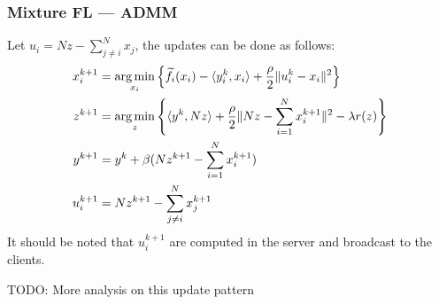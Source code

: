 \begin{frame}
\frametitle{Mixture FL --- ADMM}

Let $u_i = Nz - \sum\limits_{j\neq i}^N x_j$, the updates can be done as follows:
{\footnotesize
\begin{align*}
    x_i^{k+1} & = \operatorname*{arg\,min}_{x_i} \left\{ \widetilde{f}_i(x_i) - \langle y_i^k, x_i \rangle + \frac{\rho}{2} \lVert u_i^k - x_i \rVert^2 \right\} \\
    z^{k+1} & = \operatorname*{arg\,min}_{z} \left\{ \langle y^k, Nz \rangle + \frac{\rho}{2} \lVert Nz - \sum\limits_{i=1}^N x_i^{k+1} \rVert^2 - \lambda r(z) \right\} \\
    y^{k+1} & = y^k + \beta (Nz^{k+1} - \sum\limits_{i=1}^N x_i^{k+1}) \\
    u^{k+1}_i & = Nz^{k+1} - \sum\limits_{j\neq i}^N x_j^{k+1}
\end{align*}
}
It should be noted that $u^{k+1}_i$ are computed {\color{red} in the server} and broadcast to the clients.

{\color{red}TODO: More analysis on this update pattern}

\end{frame}





